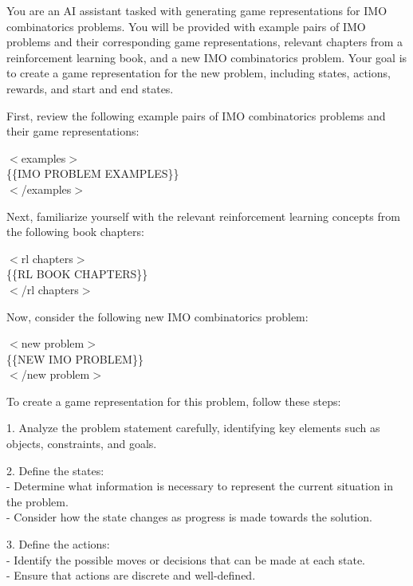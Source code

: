 \begin{tcolorbox}[enhanced, breakable, rounded corners, 
    colback=brown!5!white, colframe=brown!75!black,
    colbacktitle=brown!85!black, fonttitle=\bfseries, coltitle=white,
    title= Game Representation Prompt]
\setlength{\parskip}{1em}

You are an AI assistant tasked with generating game representations for IMO combinatorics problems. You will be provided with example pairs of IMO problems and their corresponding game representations, relevant chapters from a reinforcement learning book, and a new IMO combinatorics problem. Your goal is to create a game representation for the new problem, including states, actions, rewards, and start and end states.

First, review the following example pairs of IMO combinatorics problems and their game representations:

$<$examples$>$\\
\{\{IMO PROBLEM EXAMPLES\}\}\\
$<$/examples$>$

Next, familiarize yourself with the relevant reinforcement learning concepts from the following book chapters:

$<$rl chapters$>$\\
\{\{RL BOOK CHAPTERS\}\}\\
$<$/rl chapters$>$

Now, consider the following new IMO combinatorics problem:

$<$new problem$>$\\
\{\{NEW IMO PROBLEM\}\}\\
$<$/new problem$>$

To create a game representation for this problem, follow these steps:

1. Analyze the problem statement carefully, identifying key elements such as objects, constraints, and goals.

2. Define the states: \\
   - Determine what information is necessary to represent the current situation in the problem. \\
   - Consider how the state changes as progress is made towards the solution. 

3. Define the actions: \\
   - Identify the possible moves or decisions that can be made at each state. \\
   - Ensure that actions are discrete and well-defined. 


\end{tcolorbox}
